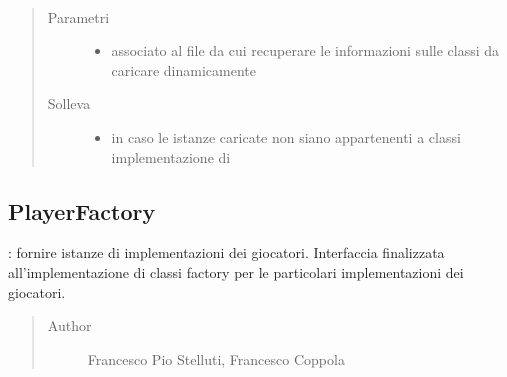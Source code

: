 \documentclass[letterpaper,10pt,italian,openany,oneside]{sphinxmanual}
\begin{document}
\begin{fulllineitems}
\label{\detokenize{source/it/unicam/cs/pa/mastermind/factories/MakerFactoryRegistry:it.unicam.cs.pa.mastermind.factories.MakerFactoryRegistry.MakerFactoryRegistry(String)}}~\begin{quote}\begin{description}
\item[{Parametri}] \leavevmode\begin{itemize}
\item {} 
 \textendash{} associato al file da cui recuperare le informazioni sulle classi da caricare dinamicamente

\end{itemize}

\item[{Solleva}] \leavevmode\begin{itemize}
\item {} 
 \textendash{} in caso le istanze caricate non siano appartenenti a classi implementazione di 

\end{itemize}

\end{description}\end{quote}

\end{fulllineitems}



\subsection{PlayerFactory}
\label{\detokenize{source/it/unicam/cs/pa/mastermind/factories/PlayerFactory:playerfactory}}\label{\detokenize{source/it/unicam/cs/pa/mastermind/factories/PlayerFactory::doc}}

\begin{fulllineitems}
\label{\detokenize{source/it/unicam/cs/pa/mastermind/factories/PlayerFactory:it.unicam.cs.pa.mastermind.factories.PlayerFactory}}
: fornire istanze di implementazioni dei giocatori. Interfaccia finalizzata all’implementazione di classi factory per le particolari implementazioni dei giocatori.
\begin{quote}\begin{description}
\item[{Author}] \leavevmode
Francesco Pio Stelluti, Francesco Coppola

\end{description}\end{quote}

\end{fulllineitems}
\end{document}
